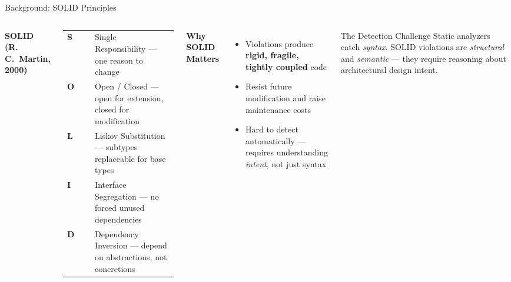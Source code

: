 \documentclass[aspectratio=169,10pt]{beamer}
\begin{document}
\begin{frame}{Background: SOLID Principles}
  \vspace{0.2cm}
  \begin{columns}[T]
      \textbf{SOLID (R.\,C.\ Martin, 2000)}
      \vspace{0.2cm}
      \begin{tabular}{@{}lp{0.75\linewidth}@{}}
        \toprule
        \textbf{S} & Single Responsibility — one reason to change \\[3pt]
        \textbf{O} & Open / Closed — open for extension, closed for modification \\[3pt]
        \textbf{L} & Liskov Substitution — subtypes replaceable for base types \\[3pt]
        \textbf{I} & Interface Segregation — no forced unused dependencies \\[3pt]
        \textbf{D} & Dependency Inversion — depend on abstractions, not concretions \\
        \bottomrule
      \end{tabular}

      \textbf{Why SOLID Matters}
      \begin{itemize}\small
        \item Violations produce \textbf{rigid, fragile, tightly coupled} code
        \item Resist future modification and raise maintenance costs
        \item Hard to detect automatically — requires understanding \emph{intent}, not just syntax
      \end{itemize}
      \vspace{0.3cm}
      \begin{block}{The Detection Challenge}
        \small Static analyzers catch \emph{syntax}. SOLID violations are \emph{structural} and \emph{semantic} — they require reasoning about architectural design intent.
      \end{block}
  \end{columns}
\end{frame}
\end{document}
